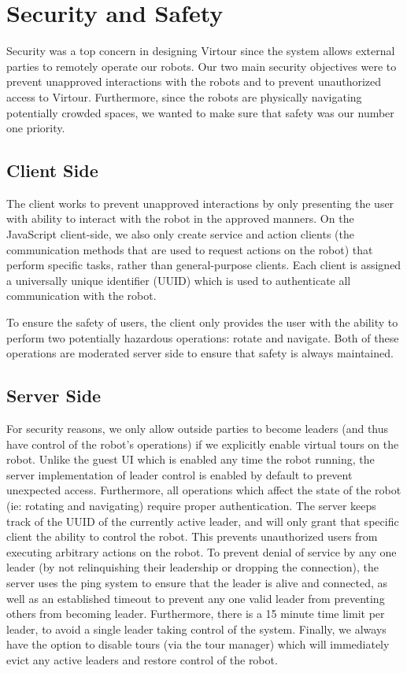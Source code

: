 \documentclass[
  oneside,
  11pt, a4paper,
  footinclude=true,
  headinclude=true,
  cleardoublepage=empty
]{article}
\begin{document}
\section{Security and Safety}\label{sec:security}

Security was a top concern in designing Virtour since the system allows
external parties to remotely operate our robots. Our two main security
objectives were to prevent unapproved interactions with the robots and to
prevent unauthorized access to Virtour. Furthermore, since the robots are
physically navigating potentially crowded spaces, we wanted to make sure that
safety was our number one priority.

\subsection{Client Side}

The client works to prevent unapproved interactions by only presenting the user
with ability to interact with the robot in the approved manners. On the
JavaScript client-side, we also only create service and action clients (the
communication methods that are used to request actions on the robot) that
perform specific tasks, rather than general-purpose clients. Each client is
assigned a universally unique identifier (UUID) which is used to authenticate
all communication with the robot.

To ensure the safety of users, the client only provides the user with the
ability to perform two potentially hazardous operations: rotate and navigate.
Both of these operations are moderated server side to ensure that safety is
always maintained.

\subsection{Server Side}

For security reasons, we only allow outside parties to become leaders (and thus
have control of the robot's operations) if we explicitly enable virtual tours
on the robot. Unlike the guest UI which is enabled any time the robot running,
the server implementation of leader control is enabled by default to prevent
unexpected access. Furthermore, all operations which affect the state of the
robot (ie: rotating and navigating) require proper authentication. The server
keeps track of the UUID of the currently active leader, and will only grant
that specific client the ability to control the robot. This prevents
unauthorized users from executing arbitrary actions on the robot. To prevent
denial of service by any one leader (by not relinquishing their leadership or
dropping the connection), the server uses the ping system to ensure that the
leader is alive and connected, as well as an established timeout to prevent any
one valid leader from preventing others from becoming leader. Furthermore,
there is a 15 minute time limit per leader, to avoid a single leader taking
control of the system. Finally, we always have the option to disable tours (via
the tour manager) which will immediately evict any active leaders and restore
control of the robot.
\end{document}
